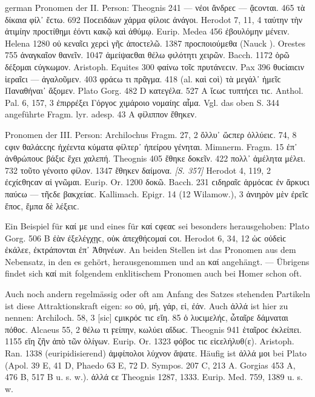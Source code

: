 \begin{otherlanguage*}{german}
Pronomen der II. Person: Theognis 241  — νέοι ἄνδρεϲ — ᾄϲονται. 465  τὰ δίκαια φίλ᾽ ἔϲτω. 692  Ποϲειδάων χάρμα φίλοιϲ ἀνάγοι. Herodot 7, 11, 4  ταύτην τὴν ἀτιμίην προϲτίθημι ἐόντι κακῷ καὶ ἀθύμῳ. Eurip. Medea 456  ἐβουλόμην μένειν. Helena 1280  οὐ κεναῖϲι χερϲὶ γῆϲ ἀποϲτελῶ. 1387  προϲποιούμεθα (Nauck ). Orestes 755  ἀναγκαῖον θανεῖν. 1047  ἀμείψαϲθαι θέλω φιλότητι χειρῶν. Bacch. 1172 ὁρῶ  δέξομαι ϲύγκωμον. Aristoph. Equites 300  φαίνω τοῖϲ πρυ\-τά\-νε\-ϲιν. Pax 396  θυϲίαιϲιν ἱεραῖϲι — ἀγαλοῦμεν. 403  φράϲω τι πρᾶγμα. 418  (al. καὶ ϲοὶ) τὰ μεγάλ᾽ ἡμεῖϲ Παναθήναι᾽ ἄξομεν. Plato Gorg. 482 D  κατεγέλα. 527 Α  ἴϲωϲ τυπτήϲει τιϲ. Anthol. Pal. 6, 157, 3  ἐπιρρέξει Γόργοϲ χιμάροιο νομαίηϲ αἷμα. Vgl. das oben S. 344 angeführte Fragm. lyr. adesp. 43 A  φίλιππον ἔθηκεν.

Pronomen der III. Person: Archilochus Fragm. 27, 2  ὄλλυ᾽ ὥϲπερ ὀλλύειϲ. 74, 8  ϲφιν θαλάϲϲηϲ ἠχέεντα κύματα φίλτερ᾽ ἠπείρου γένηται. Mimnerm. Fragm. 15  ἐπ᾽ ἀνθρώπουϲ βάξιϲ ἔχει χαλεπή. Theognis 405  ἔθηκε δοκεῖν. 422  πολλ᾽ ἀμέλητα μέλει. 732  τοῦτο γένοιτο φίλον. 1347  ἔθηκεν δαίμονα. \hypertarget{p357}{\emph{[S. 357]}}\label{p357} Herodot 4, 119, 2  ἐϲ\-χίϲ\-θη\-ϲαν αἱ γνῶμαι. Eurip. Or. 1200  δοκῶ. Bacch. 231  ϲιδηραῖϲ ἁρμόϲαϲ ἐν ἄρκυϲι παύϲω — τῆϲδε βακχείαϲ. Kallimach. Epigr. 14 (12 Wilamow.), 3  ἀνιηρὸν μὲν ἐρεῖϲ ἔποϲ, ἔμπα δὲ λέξειϲ.

Ein Beispiel für καί με und eines für καί ϲφεαϲ sei besonders herausgehoben: Plato Gorg. 506 B  ἐὰν ἐξελέγχῃϲ, οὐκ ἀπεχθήϲομαί ϲοι. Herodot 6, 34, 12  ὡϲ οὐδεὶϲ ἐκάλεε, ἐκτράπονται ἐπ᾽ Ἀθηνέων. An beiden Stellen ist das Pronomen aus dem Nebensatz, in den es gehört, herausgenommen und an καί angehängt. — Übrigens findet sich καί mit folgendem enklitischem Pronomen auch bei Homer schon oft.

Auch noch andern regelmässig oder oft am Anfang des Satzes stehenden Partikeln ist diese Attraktionskraft eigen: so οὐ, μή, γάρ, εἰ, ἐάν. Auch ἀλλά ist hier zu nennen: Archiloch. 58, 3  [sic] ϲμικρόϲ τιϲ εἴη. 85  ὁ λυϲιμελήϲ, ὦταῖρε δάμναται πόθοϲ. Alcaeus 55, 2 θέλω τι ϝείπην,  κωλύει αἴδωϲ. Theognis 941  ἑταῖροϲ ἐκλείπει. 1155  εἴη ζῆν ἀπὸ τῶν ὀλίγων. Eurip. Or. 1323  φόβοϲ τιϲ εἰϲελήλυθ(ε). Aristoph. Ran. 1338 (euripidisierend)  ἀμφίπολοι λύχνον ἅψατε. Häufig ist ἀλλά μοι bei Plato (Apol. 39 Ε, 41 D, Phaedo 63 E, 72 D. Sympos. 207 C, 213 A. Gorgias 453 A, 476 B, 517 B u. s. w.). ἀλλά ϲε Theognis 1287, 1333. Eurip. Med. 759, 1389 u. s. w.


\end{otherlanguage*}
